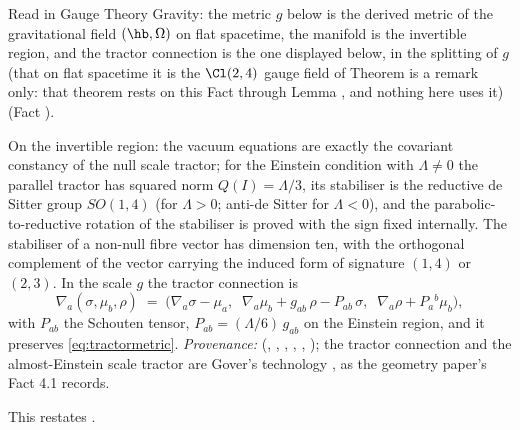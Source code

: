 Read in Gauge Theory Gravity: the metric $g$ below is the derived metric of the gravitational field $(\hb, \Omega)$ on flat spacetime, the manifold is the invertible region, and the tractor connection is the one displayed below, in the splitting of $g$ (that on flat spacetime it is the $\Cl(2,4)$ gauge field of Theorem  is a remark only: that theorem rests on this Fact through Lemma , and nothing here uses it) (Fact ).

On the invertible region: the vacuum equations are exactly the covariant constancy of the null scale tractor; for the Einstein condition with $\Lambda \neq 0$ the parallel tractor has squared norm $Q(I) = \Lambda/3$, its stabiliser is the reductive de Sitter group $SO(1,4)$ (for $\Lambda > 0$; anti-de Sitter for $\Lambda < 0$), and the parabolic-to-reductive rotation of the stabiliser is proved with the sign fixed internally. The stabiliser of a non-null fibre vector has dimension ten, with the orthogonal complement of the vector carrying the induced form of signature $(1,4)$ or $(2,3)$. In the scale $g$ the tractor connection is
\begin{equation}
\nabla_a(\sigma, \mu_b, \rho) \;=\; \bigl(\nabla_a\sigma - \mu_a,\;\; \nabla_a\mu_b + g_{ab}\,\rho - P_{ab}\,\sigma,\;\; \nabla_a\rho + P_a{}^{b}\mu_b\bigr),
\end{equation}
with $P_{ab}$ the Schouten tensor, $P_{ab} = (\Lambda/6)\,g_{ab}$ on the Einstein region, and it preserves \eqref{eq:tractormetric}. \emph{Provenance:} \cite[Fact~4.1, Thms.~4.5, 4.7, Props.~4.4, 4.10, Lem.~4.8]{ButlerT6} (, , , , , ); the tractor connection and the almost-Einstein scale tractor are Gover's technology \cite{Gover2010}, as the geometry paper's Fact 4.1 records.

This restates .
